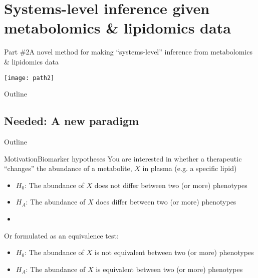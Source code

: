 \documentclass[xcolor=dvipsnames]{beamer}
\begin{document}
\section{Systems-level inference given metabolomics \& lipidomics data}

\begin{frame}{Part \#2}{A novel method for making ``systems-level'' inference from metabolomics \& lipidomics data}
\vspace{-15pt}
\begin{center}
	\texttt{[image: path2]}
\end{center}
\end{frame}

\begin{frame}{Outline}
\vspace{-10.5pt}
\tableofcontents[currentsection]
\addtocounter{framenumber}{-1}
\end{frame}

\subsection{Needed: A new paradigm}
\begin{frame}{Outline}
\vspace{-10.5pt}
\addtocounter{framenumber}{-1}
\end{frame}

\begin{frame}{Motivation}{Biomarker hypotheses}
	\vspace{-10pt}
	You are interested in whether a therapeutic ``changes'' the abundance of a metabolite, $X$ in plasma (e.g. a specific lipid) \pause
	\begin{itemize}
		\item $H_0$: The abundance of $X$ does not differ between two (or more) phenotypes \pause
		\item $H_A$: The abundance of $X$ does differ between two (or more) phenotypes 
		\item[]
	\end{itemize} \pause
	
	Or formulated as an equivalence test:
	\begin{itemize}
		\item $H_0$: The abundance of $X$ is not equivalent between two (or more) phenotypes  
		\item $H_A$: The abundance of $X$ is equivalent between two (or more) phenotypes  
	\end{itemize}
\end{frame}
\end{document}
